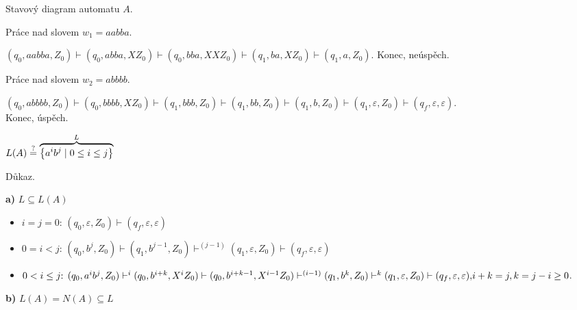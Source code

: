 \begin{multicols}{2}
    Stavový diagram automatu $A$.


\columnbreak

    Práce nad slovem $w_1 = aabba$.

    ${(q_0, aabba, Z_0) \vdash (q_0, abba, X Z_0) \vdash (q_0, bba, XXZ_0)} \vdash (q_1, ba, X Z_0) \vdash (q_1, a, Z_0)$. 
    Konec, neúspěch.

    Práce nad slovem $w_2 = abbbb$.

    $(q_0, abbbb, Z_0) \vdash (q_0, bbbb, X Z_0) \vdash (q_1, bbb, Z_0) \vdash (q_1, bb, Z_0) \vdash (q_1, b, Z_0)
    \vdash (q_1, \varepsilon, Z_0) \vdash (q_f, \varepsilon, \varepsilon)$. \\Konec, úspěch.
\end{multicols}
$L(A) \stackrel{?}{=} \overbrace{\left\lbrace a^i b^j \mid 0 \leq i \leq j \right\rbrace}^L$

Důkaz.

\textbf{a)} $L \subseteq L(A)$
\begin{itemize}[leftmargin=*]
    \item $i=j=0 \text{: } (q_0, \varepsilon, Z_0) \vdash (q_f, \varepsilon, \varepsilon)$
    \item $0=i < j \text{: } (q_0, b^j, Z_0) \vdash (q_1, b^{j-1}, Z_0) \vdash^{(j-1)} (q_1, \varepsilon, Z_0) 
    \vdash (q_f, \varepsilon, \varepsilon)$
    \item ${0<i \leq j \text{: } (q_0, a^i b^j, Z_0) \vdash^i (q_0, b^{i+k}, X^i Z_0) \vdash (q_0, b^{i+k-1}, X^{i-1} Z_0)
    \vdash^{(i-1)} (q_1, b^k, Z_0) \vdash^k (q_1, \varepsilon, Z_0) \vdash (q_f, \varepsilon, \varepsilon),}\\
    i+k = j, k=j-i \geq 0$.
\end{itemize}
\textbf{b)} $L(A) = N(A) \subseteq L$


